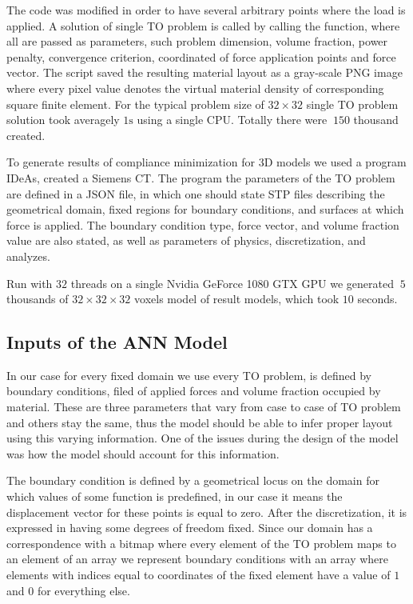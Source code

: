 The code was modified in order to have several arbitrary points where the load is applied.
A solution of single TO problem is called by calling the function, where all are passed as parameters, such problem dimension, volume fraction, power penalty, convergence criterion, coordinated of force application points and force vector. 
The script saved the resulting material layout as a gray-scale PNG image where every pixel value denotes the virtual material density of corresponding square finite element.
For the typical problem size of $ 32 \times 32 $ single TO problem solution took averagely $1 \mathrm{s}$ using a single CPU.
Totally there were $~150$ thousand created.
\medskip

To generate results of compliance minimization for 3D models we used a program IDeAs\cite{.}, created a Siemens CT.
The program the parameters of the TO problem are defined in a JSON file, in which one should state STP files describing the geometrical domain, fixed regions for boundary conditions, and surfaces at which force is applied.
The boundary condition type, force vector, and volume fraction value are also stated, as well as parameters of physics, discretization, and analyzes. 

Run with $32$ threads on a single Nvidia GeForce 1080 GTX GPU we generated $~5$ thousands of $32 \times 32 \times 32$ voxels model of result models, which took $10$ seconds.
 



\subsection{Inputs of the ANN Model}

In our case for every fixed domain we use every TO problem, is defined by boundary conditions, filed of applied forces and volume fraction occupied by material. 
These are three parameters that vary from case to case of TO problem and others stay the same, thus the model should be able to infer proper layout using this varying information.
One of the issues during the design of the model was how the model should account for this information.
\medskip

The boundary condition is defined by a geometrical locus on the domain for which values of some function is predefined, in our case it means the displacement vector for these points is equal to zero. 
After the discretization, it is expressed in having some degrees of freedom fixed. 
Since our domain has a correspondence with a bitmap where every element of the TO problem maps to an element of an array we represent boundary conditions with an array where elements with indices equal to coordinates of the fixed element have a value of $1$ and $0$ for everything else.
\medskip

